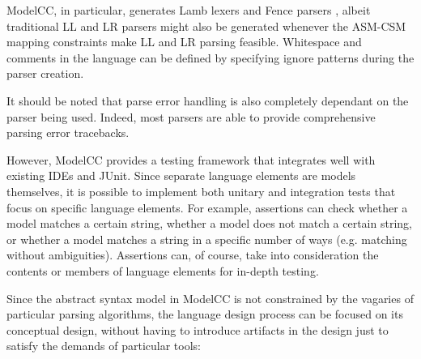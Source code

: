 \documentclass[preprint]{elsarticle}
\begin{document}
ModelCC, in particular, generates Lamb lexers \cite{Quesada2011a} and Fence parsers \cite{Quesada2012f}, albeit traditional LL and LR parsers might also be generated whenever the ASM-CSM mapping constraints make LL and LR parsing feasible.
Whitespace and comments in the language can be defined by specifying ignore patterns during the parser creation.

It should be noted that parse error handling is also completely dependant on the parser being used. Indeed, most parsers are able to provide comprehensive parsing error tracebacks.

However, ModelCC provides a testing framework that integrates well with existing IDEs and JUnit.
Since separate language elements are models themselves, it is possible to implement both unitary and integration tests that focus on specific language elements.
For example, assertions can check whether a model matches a certain string, whether a model does not match a certain string, or whether a model matches a string in a specific number of ways (e.g. matching without ambiguities).
Assertions can, of course, take into consideration the contents or members of language elements for in-depth testing.

Since the abstract syntax model in ModelCC is not constrained by the vagaries of particular parsing algorithms, the language design process can be focused on its conceptual design, without having to introduce artifacts in the design just to satisfy the demands of particular tools:
\end{document}
